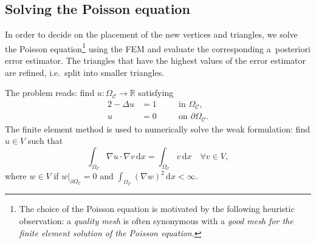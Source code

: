 \documentclass[12pt]{rmstyle}
\begin{document}
\subsection{Solving the Poisson equation}
\label{sec:poisson}

In order to decide on the placement of the new vertices and triangles, we solve
the Poisson equation\footnote{The choice of the Poisson equation is motivated by
the following heuristic observation: a \emph{quality mesh} is often synonymous
with a \emph{good mesh for the finite element solution of the Poisson
equation}.} using the FEM and evaluate the corresponding a~posteriori error
estimator.  The triangles that have the highest values of the error estimator
are refined, i.e.~split into smaller triangles.

The problem reads: find $u : \Omega_{\mathcal{C}} \rightarrow \mathbb{R}$ satisfying
\begin{alignat}{2}
-\Delta u &= 1 \quad && \text{in $\Omega_{\mathcal{C}}$,} \\
u &= 0 \quad && \text{on $\partial \Omega_{\mathcal{C}}$.}
\end{alignat}
The finite element method is used to numerically solve the
weak formulation: find \(u \in V\) such that
\begin{equation}
   \label{eq:weakform}
   \int_{\Omega_{\mathcal{C}}} \nabla u \cdot \nabla v \,\mathrm{d}x = \int_{\Omega_{\mathcal{C}}} v\,\mathrm{d}x \quad \forall v \in V,
\end{equation}
where
\(w \in V\) if \(w |_{\partial \Omega_{\mathcal{C}}} = 0\) and
$
   \int_{\Omega_{\mathcal{C}}} (\nabla w)^2 \,\mathrm{d}x < \infty.
$
\end{document}
